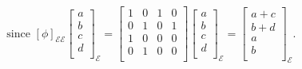 \documentclass{report}
\begin{document}
{    \[
      \text{ since } \left[ \phi  \right]  _{ \mathcal{E} \mathcal{E}} \begin{bmatrix}
      a\\
      b\\
      c\\
      d\\
      \end{bmatrix}
       _{ \mathcal{E}} = \begin{bmatrix}
       1 & 0 & 1 & 0\\
       0 & 1 & 0 & 1\\
       1 & 0 & 0 & 0\\
       0 & 1 & 0 & 0\\
       \end{bmatrix} \begin{bmatrix}
       a\\
       b\\
       c\\
       d\\
       \end{bmatrix}
        _{ \mathcal{E}} = \begin{bmatrix}
        a+c\\
        b+d\\
        a\\
        b\\
        \end{bmatrix}_{ \mathcal{E}}
    .\] 
   }
   
\end{document}
